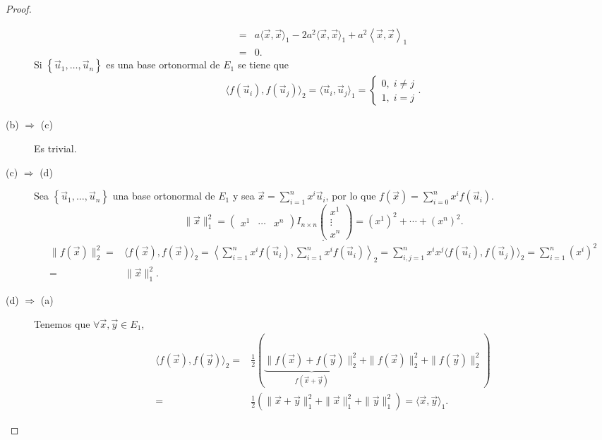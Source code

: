 \begin{proof}
\begin{description}
\[\begin{split}
		= & a\langle\vec{x}, \vec{x}\rangle_{1} -2a^{2}\langle\vec{x},\vec{x}\rangle_{1} +a^{2}\left\langle \vec{x}, \vec{x} \right\rangle _{1}  \\
		= & 0.
	\end{split}
	\]
	Si $\displaystyle \left\{ \vec{u}_{1}, \ldots ,\vec{u}_{n}\right\}  $ es una base ortonormal de $\displaystyle E_{1} $ se tiene que 
	\[
	\begin{split}
	\langle f\left(\vec{u}_{i}\right), f\left(\vec{u}_{j}\right) \rangle_{2} = \langle\vec{u}_{i}, \vec{u}_{j}\rangle_{1} = 
	\begin{cases}
	0, \; i \neq j \\
	1, \; i = j
	\end{cases}
	.
	\end{split}
	\]
\item[(b) $\displaystyle \Rightarrow $ (c)] Es trivial. 
\item[(c) $\displaystyle \Rightarrow $ (d)] Sea $\displaystyle \left\{ \vec{u}_{1}, \ldots, \vec{u}_{n}\right\}  $ una base ortonormal de $\displaystyle E_{1} $ y sea $\displaystyle \vec{x} = \sum^{n}_{i=1}x^{i}\vec{u}_{i} $, por lo que $\displaystyle f\left(\vec{x}\right) = \sum^{n}_{i=0}x^{i}f\left(\vec{u}_{i}\right) $.
	\[ \| \vec{x}\|^{2}_{1} = \begin{pmatrix} x^{1} & \cdots & x^{n} \end{pmatrix}I_{n\times n}\begin{pmatrix} x^{1} \\ \vdots \\ x^{n} \end{pmatrix} = \left(x^{1}\right)^{2} + \cdots + \left(x^{n}\right)^{2}.\]
\[  .\]
\[
\begin{split}
	\| f\left(\vec{x}\right)\|^{2}_{2} = & \langle f\left(\vec{x}\right), f\left(\vec{x}\right)\rangle_{2} = \left\langle \sum^{n}_{i=1}x^{i}f\left(\vec{u}_{i}\right), \sum^{n}_{i=1}x^{i}f\left(\vec{u}_{i}\right)\right\rangle_{2} 
	=   \sum^{n}_{i,j=1}x^{i}x^{j}\langle f\left(\vec{u}_{i}\right), f\left(\vec{u}_{j}\right)\rangle_{2} = \sum^{n}_{i=1}\left(x^{i}\right)^{2} \\
	= &  \|\vec{x}\|^{2}_{1}.
\end{split}
\]
\item[(d) $\displaystyle \Rightarrow $ (a)] Tenemos que $\displaystyle \forall \vec{x}, \vec{y} \in E_{1} $, 
	\[
	\begin{split}
		\langle f\left(\vec{x}\right), f\left(\vec{y}\right)\rangle_{2} = & \frac{1}{2}\left(\underbrace{\|f\left(\vec{x}\right)  +f\left(\vec{y}\right)\|^{2}_{2}}_{f\left(\vec{x}+\vec{y}\right)} + \|f\left(\vec{x}\right)\|^{2}_{2}+\|f\left(\vec{y}\right)\|^{2}_{2}\right)\\
		= & \frac{1}{2}\left(\|\vec{x}+\vec{y}\|^{2}_{1}+\|\vec{x}\|^{2}_{1}+\|\vec{y}\|^{2}_{1}\right) = \langle \vec{x}, \vec{y}\rangle_{1} .
	\end{split}
	\]
\end{description}
\end{proof}
